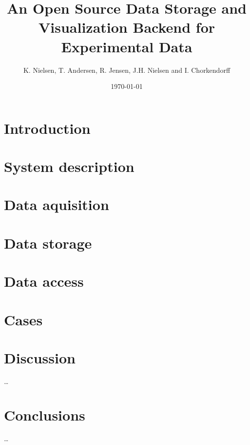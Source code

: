 \documentclass[12pt,draft]{article}
\title{An Open Source Data Storage and Visualization Backend for Experimental
Data}
\author{K. Nielsen, T. Andersen, R. Jensen, J.H. Nielsen and I. Chorkendorff}
\date{\today}
\begin{document}
\doublespacing %
\maketitle

\begin{abstract}

\end{abstract}

\section{Introduction}


\section{System description}


\section{Data aquisition}


\section{Data storage}\label{data_storage}


\section{Data access}


\section{Cases}


\section{Discussion}
\ldots

\section{Conclusions}
\ldots



\end{document}

